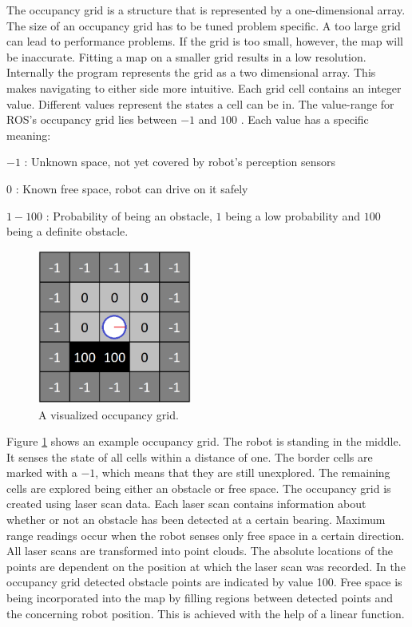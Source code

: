 \documentclass{ba-kecs}
\begin{document}
The occupancy grid is a structure that is represented by a one-dimensional array. The size of an occupancy grid has to be tuned problem specific. A too large grid can lead to performance problems. If the grid is too small, however, the map will be inaccurate. Fitting a map on a smaller grid results in a low resolution.
Internally the program represents the grid as a two dimensional array. This makes navigating to either side more intuitive. Each grid cell contains an integer value. Different values represent the states a cell can be in. The value-range for ROS's occupancy grid lies between $-1$ and $100$ \cite{occupancy}. Each value has a specific meaning:
\begin{description}
\item{$-1$} : Unknown space, not yet covered by robot's perception sensors
\item{$0$} : Known free space, robot can drive on it safely
\item{$1-100$} : Probability of being an obstacle, $1$ being a low probability and $100$ being a definite obstacle.
\end{description}
\begin{figure}[htbp]
	\centering
		\includegraphics[width=0.45\textwidth]{figures/Occup.png}
	\caption{A visualized occupancy grid.}
	\label{fig:Occupancy}
\end{figure}
Figure \ref{fig:Occupancy} shows an example occupancy grid. The robot is standing in the middle. It senses the state of all cells within a distance of one. The border cells are marked with a $-1$, which means that they are still unexplored. The remaining cells are explored being either an obstacle or free space.
The occupancy grid is created using laser scan data. Each laser scan contains information about whether or not an obstacle has been detected at a certain bearing. Maximum range readings occur when the robot senses only free space in a certain direction. All laser scans are transformed into point clouds. The absolute locations of the points are dependent on the position at which the laser scan was recorded.
In the occupancy grid detected obstacle points are indicated by value 100.
Free space is being incorporated into the map by filling regions between detected points and the concerning robot position. This is achieved with the help of a linear function. 
\end{document}
